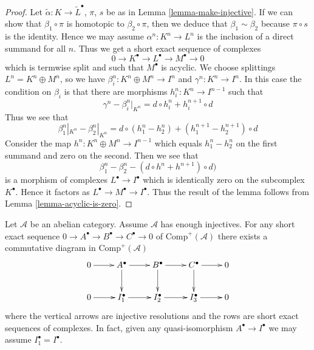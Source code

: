 \begin{proof}
Let $\tilde \alpha : K \to \tilde L^\bullet$, $\pi$, $s$ be as in
Lemma \ref{lemma-make-injective}. If we can show that $\beta_1 \circ\pi$
is homotopic to $\beta_2 \circ \pi$, then we deduce that
$\beta_1 \sim \beta_2$ because $\pi \circ s$ is the identity.
Hence we may assume $\alpha^n : K^n \to L^n$ is the
inclusion of a direct summand for all $n$. Thus we get a
short exact sequence of complexes
$$
0 \to K^\bullet \to L^\bullet \to M^\bullet \to 0
$$
which is termwise split and such that $M^\bullet$ is acyclic.
We choose splittings $L^n = K^n \oplus M^n$, so we have
$\beta_i^n : K^n \oplus M^n \to I^n$ and $\gamma^n : K^n \to I^n$.
In this case the condition on $\beta_i$ is that there are morphisms
$h_i^n : K^n \to I^{n - 1}$ such that
$$
\gamma^n - \beta_i^n|_{K^n} = d \circ h_i^n + h_i^{n + 1} \circ d
$$
Thus we see that
$$
\beta_1^n|_{K^n} - \beta_2^n|_{K^n}
=
d \circ (h_1^n - h_2^n) + (h_1^{n + 1} - h_2^{n + 1}) \circ d
$$
Consider the map $h^n : K^n \oplus M^n \to I^{n - 1}$ which
equals $h_1^n - h_2^n$ on the first summand and zero on the second.
Then we see that
$$
\beta_1^n - \beta_2^n
-
(d \circ h^n + h^{n + 1}) \circ d)
$$
is a morphism of complexes $L^\bullet \to I^\bullet$
which is identically zero on the subcomplex $K^\bullet$.
Hence it factors as $L^\bullet \to M^\bullet \to I^\bullet$.
Thus the result of the lemma follows from Lemma \ref{lemma-acyclic-is-zero}.
\end{proof}

\begin{lemma}
\label{lemma-injective-resolution-ses}
Let $\mathcal{A}$ be an abelian category.
Assume $\mathcal{A}$ has enough injectives.
For any short exact sequence
$0 \to A^\bullet \to B^\bullet \to C^\bullet \to 0$
of $\text{Comp}^{+}(\mathcal{A})$ there exists a
commutative diagram in $\text{Comp}^{+}(\mathcal{A})$
$$
\xymatrix{
0 \ar[r] &
A^\bullet \ar[r] \ar[d] &
B^\bullet \ar[r] \ar[d] &
C^\bullet \ar[r] \ar[d] &
0 \\
0 \ar[r] &
I_1^\bullet \ar[r] &
I_2^\bullet \ar[r] &
I_3^\bullet \ar[r] &
0
}
$$
where the vertical arrows are injective resolutions and
the rows are short exact sequences of complexes.
In fact, given any quasi-isomorphism $A^\bullet \to I^\bullet$
we may assume $I_1^\bullet = I^\bullet$.
\end{lemma}

